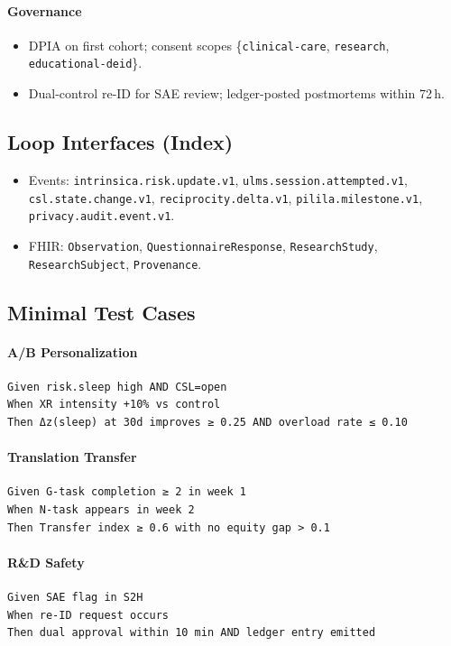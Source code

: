 \documentclass[11pt]{article}
\theoremstyle{plain}
\begin{document}
\paragraph{Governance}
\begin{itemize}
  \item DPIA on first cohort; consent scopes \{\texttt{clinical-care}, \texttt{research}, \texttt{educational-deid}\}.
  \item Dual-control re-ID for SAE review; ledger-posted postmortems within 72\,h.
\end{itemize}

\bigskip
\subsection{Loop Interfaces (Index)}
\begin{itemize}
  \item Events: \texttt{intrinsica.risk.update.v1}, \texttt{ulms.session.attempted.v1}, \texttt{csl.state.change.v1}, \texttt{reciprocity.delta.v1}, \texttt{pilila.milestone.v1}, \texttt{privacy.audit.event.v1}.
  \item FHIR: \texttt{Observation}, \texttt{QuestionnaireResponse}, \texttt{ResearchStudy}, \texttt{ResearchSubject}, \texttt{Provenance}.
\end{itemize}

\subsection{Minimal Test Cases}
\paragraph{A/B Personalization}
\begin{verbatim}
Given risk.sleep high AND CSL=open
When XR intensity +10% vs control
Then Δz(sleep) at 30d improves ≥ 0.25 AND overload rate ≤ 0.10
\end{verbatim}

\paragraph{Translation Transfer}
\begin{verbatim}
Given G-task completion ≥ 2 in week 1
When N-task appears in week 2
Then Transfer index ≥ 0.6 with no equity gap > 0.1
\end{verbatim}

\paragraph{R\&D Safety}
\begin{verbatim}
Given SAE flag in S2H
When re-ID request occurs
Then dual approval within 10 min AND ledger entry emitted
\end{verbatim}
\end{document}
